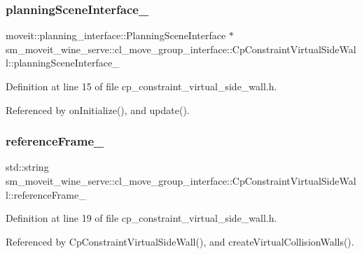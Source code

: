 \subsubsection{\texorpdfstring{planning\+Scene\+Interface\+\_\+}{planningSceneInterface\_}}
{\footnotesize\ttfamily moveit\+::planning\+\_\+interface\+::\+Planning\+Scene\+Interface $\ast$ sm\+\_\+moveit\+\_\+wine\+\_\+serve\+::cl\+\_\+move\+\_\+group\+\_\+interface\+::\+Cp\+Constraint\+Virtual\+Side\+Wall\+::planning\+Scene\+Interface\+\_\+\hspace{0.3cm}{\ttfamily [private]}}



Definition at line 15 of file cp\+\_\+constraint\+\_\+virtual\+\_\+side\+\_\+wall.\+h.



Referenced by on\+Initialize(), and update().

\mbox{\label{classsm__moveit__wine__serve_1_1cl__move__group__interface_1_1CpConstraintVirtualSideWall_a832273800ad6780a7b3cd35bc58e4e75}} 
\subsubsection{\texorpdfstring{reference\+Frame\+\_\+}{referenceFrame\_}}
{\footnotesize\ttfamily std\+::string sm\+\_\+moveit\+\_\+wine\+\_\+serve\+::cl\+\_\+move\+\_\+group\+\_\+interface\+::\+Cp\+Constraint\+Virtual\+Side\+Wall\+::reference\+Frame\+\_\+\hspace{0.3cm}{\ttfamily [private]}}



Definition at line 19 of file cp\+\_\+constraint\+\_\+virtual\+\_\+side\+\_\+wall.\+h.



Referenced by Cp\+Constraint\+Virtual\+Side\+Wall(), and create\+Virtual\+Collision\+Walls().

